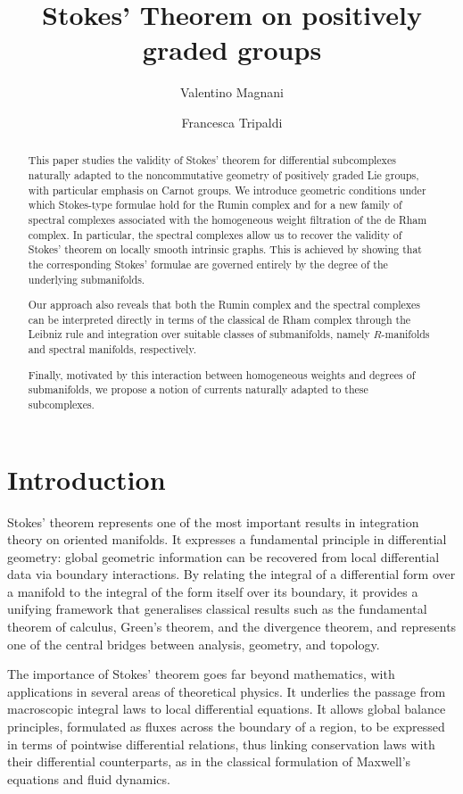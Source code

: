 \documentclass[dvipsnames]{amsart}
\title[Stokes' Theorem on positively graded groups]{Stokes' Theorem on positively graded groups}
\author[V.~Magnani]{Valentino Magnani}
\author[F.~Tripaldi]{Francesca Tripaldi}
\date{}
\theoremstyle{definition}
\theoremstyle{definition}
\numberwithin{equation}{section}
\begin{document}
\maketitle
\begin{abstract}
  This paper studies the validity of Stokes’ theorem for differential subcomplexes naturally adapted to the noncommutative geometry of positively graded Lie groups, with particular emphasis on Carnot groups. We introduce geometric conditions under which Stokes-type formulae hold for the Rumin complex and for a new family of spectral complexes associated with the homogeneous weight filtration of the de Rham complex. In particular, the spectral complexes allow us to recover the validity of Stokes’ theorem on locally smooth intrinsic graphs. This is achieved by showing that the corresponding Stokes' formulae are governed entirely by the degree of the underlying submanifolds.
  
  Our approach also reveals that both the Rumin complex and the spectral complexes can be interpreted directly in terms of the classical de Rham complex through the Leibniz rule and integration over suitable classes of submanifolds, namely $R$-manifolds and spectral manifolds, respectively. 
  
  Finally, motivated by this interaction between homogeneous weights and degrees of submanifolds, we propose a notion of currents naturally adapted to these subcomplexes.
\end{abstract}

\tableofcontents



\section{Introduction}

Stokes' theorem represents one of the most important results in integration theory on oriented manifolds. It expresses a fundamental principle in differential geometry: global geometric information can be recovered from local differential data via boundary interactions. By relating the integral of a differential form over a manifold to the integral of the form itself over its boundary, it provides a unifying framework that generalises classical results such as the fundamental theorem of calculus, Green’s theorem, and the divergence theorem, and represents one of the central bridges between analysis, geometry, and topology.

The importance of Stokes' theorem goes far beyond mathematics, with applications in several areas of theoretical physics. It underlies the passage from macroscopic integral laws to local differential equations. It allows global balance principles, formulated as fluxes across the boundary of a region, to be expressed in terms of pointwise differential relations, thus linking conservation laws with their differential counterparts, as in the classical formulation of Maxwell’s equations and fluid dynamics.
\end{document}
